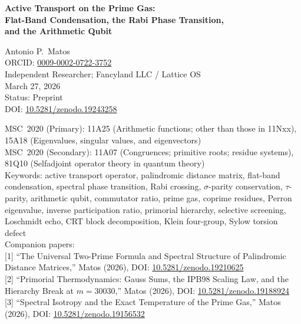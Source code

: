 \documentclass[11pt,letterpaper]{article}
\theoremstyle{definition}
\theoremstyle{remark}
\begin{document}
\begin{center}
{\LARGE\bfseries Active Transport on the Prime Gas:\\[0.3em]
Flat-Band Condensation, the Rabi Phase Transition,\\[0.3em]
and the Arithmetic Qubit}

\vspace{1.5em}

{\large Antonio P.\ Matos}\\[0.5em]
\small ORCID: \href{https://orcid.org/0009-0002-0722-3752}{0009-0002-0722-3752}\\[0.3em]
\small Independent Researcher; Fancyland LLC / Lattice OS\\[0.3em]
\small March 27, 2026\\[0.5em]
\small Status: Preprint\\[0.3em]
\small DOI: \href{https://doi.org/10.5281/zenodo.19243258}{10.5281/zenodo.19243258}\\[0.5em]

\vspace{0.5em}

\small
MSC~2020 (Primary): 11A25 (Arithmetic functions; other than those in 11Nxx),
15A18 (Eigenvalues, singular values, and eigenvectors)\\
MSC~2020 (Secondary): 11A07 (Congruences; primitive roots; residue systems),
81Q10 (Selfadjoint operator theory in quantum theory)\\[0.3em]
Keywords: active transport operator, palindromic distance matrix, flat-band condensation,
spectral phase transition, Rabi crossing, $\sigma$-parity conservation, $\tau$-parity,
arithmetic qubit, commutator ratio, prime gas, coprime residues, Perron eigenvalue,
inverse participation ratio, primorial hierarchy, selective screening, Loschmidt echo,
CRT block decomposition, Klein four-group, Sylow torsion defect\\[0.5em]

\small Companion papers:\\
{}[1] ``The Universal Two-Prime Formula and Spectral Structure of Palindromic
Distance Matrices,'' Matos (2026), DOI: \href{https://doi.org/10.5281/zenodo.19210625}{10.5281/zenodo.19210625}\\
{}[2] ``Primorial Thermodynamics: Gauss Sums, the IPB98 Scaling Law, and the
Hierarchy Break at $m = 30030$,'' Matos (2026), DOI: \href{https://doi.org/10.5281/zenodo.19188924}{10.5281/zenodo.19188924}\\
{}[3] ``Spectral Isotropy and the Exact Temperature of the Prime Gas,'' Matos (2026),
DOI: \href{https://doi.org/10.5281/zenodo.19156532}{10.5281/zenodo.19156532}

\end{center}
\end{document}
